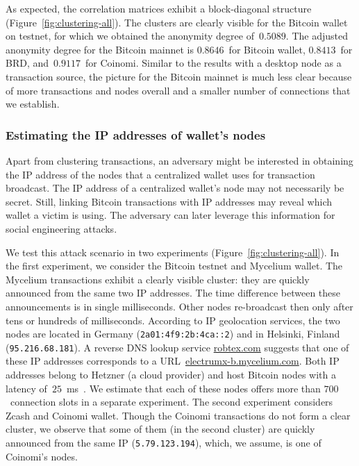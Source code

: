As expected, the correlation matrices exhibit a block-diagonal structure (Figure~\ref{fig:clustering-all}).
The clusters are clearly visible for the Bitcoin wallet on testnet, for which we obtained the anonymity degree of~$0.5089$.
The adjusted anonymity degree for the Bitcoin mainnet is $0.8646$~for Bitcoin wallet, $0.8413$~for BRD, and~$0.9117$~for Coinomi.
Similar to the results with a desktop node as a transaction source, the picture for the Bitcoin mainnet is much less clear because of more transactions and nodes overall and a smaller number of connections that we establish.


\subsubsection*{Estimating the IP addresses of wallet's nodes}

Apart from clustering transactions, an adversary might be interested in obtaining the IP address of the nodes that a centralized wallet uses for transaction broadcast.
The IP address of a centralized wallet's node may not necessarily be secret.
Still, linking Bitcoin transactions with IP addresses may reveal which wallet a victim is using.
The adversary can later leverage this information for social engineering attacks.

We test this attack scenario in two experiments (Figure~\ref{fig:clustering-all}).
In the first experiment, we consider the Bitcoin testnet and Mycelium wallet.
The Mycelium transactions exhibit a clearly visible cluster: they are quickly announced from the same two IP addresses.
The time difference between these announcements is in single milliseconds.
Other nodes re-broadcast then only after tens or hundreds of milliseconds.
According to IP geolocation services, the two nodes are located in Germany (\texttt{2a01:4f9:2b:4ca::2}) and in Helsinki, Finland (\texttt{95.216.68.181}).
A reverse DNS lookup service \url{robtex.com} suggests that one of these IP addresses corresponds to a URL~\url{electrumx-b.mycelium.com}.
Both IP addresses belong to Hetzner (a cloud provider) and host Bitcoin nodes with a latency of~$25$~ms~\cite{Bitnodes}.
We estimate that each of these nodes offers more than $700$~connection slots in a separate experiment.
The second experiment considers Zcash and Coinomi wallet.
Though the Coinomi transactions do not form a clear cluster, we observe that some of them (in the second cluster) are quickly announced from the same IP (\texttt{5.79.123.194}), which, we assume, is one of Coinomi's nodes.


